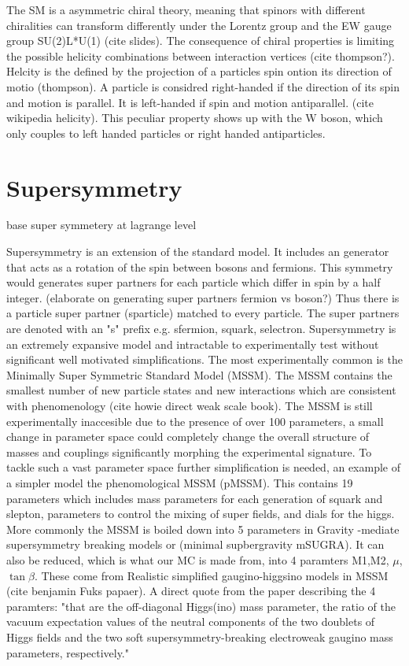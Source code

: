 The SM is a asymmetric chiral theory, meaning that spinors with different chiralities can
transform differently under the Lorentz group and the EW gauge group
SU(2)L*U(1) (cite slides).  The consequence of chiral properties is limiting the possible helicity combinations between interaction vertices (cite thompson?). Helcity is the defined by the projection of a particles spin ontion its direction of motio (thompson). A particle is considred right-handed if the direction of its spin and motion is parallel. It is left-handed if spin and motion antiparallel. (cite wikipedia helicity). This peculiar property shows up with the W boson, which only couples to left handed particles or right handed antiparticles.

\section{Supersymmetry}

base super symmetery at lagrange level

Supersymmetry is an extension of the standard model. It includes an generator that acts as a rotation of the spin between bosons and fermions. This symmetry would generates super partners for each particle which differ in spin by a half integer. (elaborate on generating super partners fermion vs boson?) Thus there is a particle super partner (sparticle) matched to every particle. The super partners are denoted with an "s" prefix e.g. sfermion, squark, selectron. Supersymmetry is an extremely expansive model and intractable to experimentally test without significant well motivated simplifications. The most experimentally common is the Minimally Super Symmetric Standard Model (MSSM). The MSSM contains the smallest number of new particle states and new interactions which are consistent with phenomenology (cite howie direct weak scale book). The MSSM is still experimentally inaccesible due to the presence of over 100 parameters, a small change in parameter space could completely change the overall structure of masses and couplings significantly morphing the experimental signature. To tackle such a vast parameter space further simplification is needed, an example of a simpler model the phenomological MSSM (pMSSM). This contains 19 parameters which includes mass parameters for each generation of squark and slepton, parameters to control the mixing of super fields, and dials for the higgs.  More commonly the MSSM is boiled down into 5 parameters in Gravity -mediate supersymmetry breaking models or (minimal supbergravity mSUGRA). It can also be reduced, which is what our MC is made from, into 4 paramters M1,M2, $\mu$, $\tan\beta$. These come from Realistic simplified gaugino-higgsino models in MSSM (cite benjamin Fuks papaer). A direct quote from the paper describing the 4 paramters: "that are the off-diagonal Higgs(ino) mass parameter, the ratio of the vacuum expectation values of the neutral components of the two doublets of Higgs fields and the two soft
supersymmetry-breaking electroweak gaugino mass parameters, respectively."

